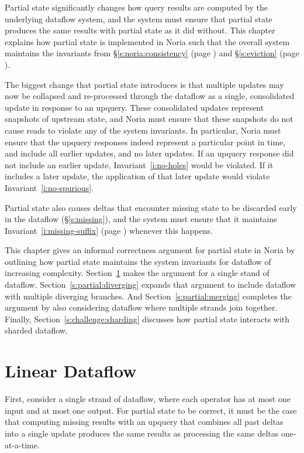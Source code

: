 Partial state significantly changes how query results are computed by the
underlying dataflow system, and the system must ensure that partial state
produces the same results with partial state as it did without. This chapter
explains how partial state is implemented in Noria such that the overall system
maintains the invariants from \S\ref{s:noria:consistency} (page
\pageref{i:no-spurious}) and \S\ref{s:eviction} (page
\pageref{i:missing-suffix}).

The biggest change that partial state introduces is that multiple updates may
now be collapsed and re-processed through the dataflow as a single, consolidated
update in response to an upquery. These consolidated updates represent snapshots
of upstream state, and Noria must ensure that these snapshots do not cause reads
to violate any of the system invariants. In particular, Noria must ensure that
the upquery responses indeed represent a particular point in time, and include
all earlier updates, and no later updates. If an upquery response did not
include an earlier update, Invariant~\ref{i:no-holes} would be violated. If it
includes a later update, the application of that later update would violate
Invariant~\ref{i:no-spurious}.

Partial state also causes deltas that encounter missing state to be discarded
early in the dataflow (\S\ref{s:missing}), and the system must ensure that it
maintains Invariant~\ref{i:missing-suffix} (page \pageref{i:missing-suffix})
whenever this happens.

This chapter gives an informal correctness argument for partial state in Noria
by outlining how partial state maintains the system invariants for dataflow of
increasing complexity. Section~\ref{s:partial:linear} makes the argument for a
single stand of dataflow. Section~\ref{s:partial:diverging} expands that
argument to include dataflow with multiple diverging branches. And
Section~\ref{s:partial:merging} completes the argument by also considering
dataflow where multiple strands join together. Finally,
Section~\ref{s:challenge:sharding} discusses how partial state interacts with
sharded dataflow.

\section{Linear Dataflow}
\label{s:partial:linear}

First, consider a single strand of dataflow, where each operator has at most one
input and at most one output. For partial state to be correct, it must be the
case that computing missing results with an upquery that combines all past
deltas into a single update produces the same results as processing the same
deltas one-at-a-time.


